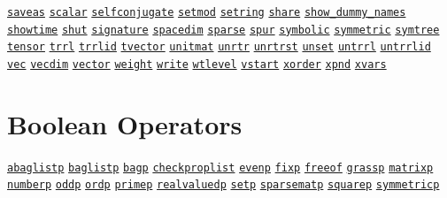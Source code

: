 \begin{list}{}
\hyperlink{command:SAVEAS}{\texttt{saveas}}
\hyperlink{command:SCALAR}{\texttt{scalar}}
\hyperlink{command:SELFCONJUGATE}{\texttt{selfconjugate}}
\hyperlink{command:SETMOD}{\texttt{setmod}}
\hyperlink{command:SETRING}{\texttt{setring}}
\hyperlink{command:SHARE}{\texttt{share}}
\hyperlink{command:SHOW_DUMMY_NAMES}{\texttt{show\_dummy\_names}}
\hyperlink{command:SHOWTIME}{\texttt{showtime}}
\hyperlink{command:SHUT}{\texttt{shut}}
\hyperlink{command:SIGNATURE}{\texttt{signature}}
\hyperlink{command:SPACEDIM}{\texttt{spacedim}}
\hyperlink{command:SPARSE}{\texttt{sparse}}
\hyperlink{command:SPUR}{\texttt{spur}}
\hyperlink{target:modes}{\texttt{symbolic}}
\hyperlink{reserved:SYMMETRIC}{\texttt{symmetric}}
\hyperlink{command:SYMTREE}{\texttt{symtree}}
\hyperlink{command:TENSOR}{\texttt{tensor}}
\hyperlink{command:TRRL}{\texttt{trrl}}
\hyperlink{command:TRRLID}{\texttt{trrlid}}
\hyperlink{command:TVECTOR}{\texttt{tvector}}
\hyperlink{command:UNITMAT}{\texttt{unitmat}}
\hyperlink{command:UNRTR}{\texttt{unrtr}}
\hyperlink{command:UNRTRST}{\texttt{unrtrst}}
\hyperlink{command:UNSET}{\texttt{unset}}
\hyperlink{command:UNTRRL}{\texttt{untrrl}}
\hyperlink{command:UNTRRLID}{\texttt{untrrlid}}
\hyperlink{command:VEC}{\texttt{vec}}
\hyperlink{command:VECDIM}{\texttt{vecdim}}
\hyperlink{command:VECTOR}{\texttt{vector}}
\hyperlink{command:WEIGHT}{\texttt{weight}}
\hyperlink{command:WRITE}{\texttt{write}}
\hyperlink{command:WTLEVEL}{\texttt{wtlevel}}
\hyperlink{command:VSTART}{\texttt{vstart}}
\hyperlink{command:XORDER}{\texttt{xorder}}
\hyperlink{command:XPND}{\texttt{xpnd}}
\hyperlink{command:XVARS}{\texttt{xvars}}
\halfinterwordspace

\section{Boolean Operators}

\doubleinterwordspace
\hyperlink{operator:ABAGLISTP}{\texttt{abaglistp}}
\hyperlink{operator:BAGLISTP}{\texttt{baglistp}}
\hyperlink{operator:BAGP}{\texttt{bagp}}
\hyperlink{operator:CHECKPROPLIST}{\texttt{checkproplist}}
\hyperlink{operator:EVENP}{\texttt{evenp}}
\hyperlink{operator:FIXP}{\texttt{fixp}}
\hyperlink{operator:FREEOF}{\texttt{freeof}}
\hyperlink{operator:GRASSP}{\texttt{grassp}}
\hyperlink{operator:MATRIXP}{\texttt{matrixp}}
\hyperlink{operator:NUMBERP}{\texttt{numberp}}
\hyperlink{operator:ODDP}{\texttt{oddp}}
\hyperlink{operator:ORDP}{\texttt{ordp}}
\hyperlink{operator:PRIMEP}{\texttt{primep}}
\hyperlink{operator:REALVALUEDP}{\texttt{realvaluedp}}
\hyperlink{operator:SETP}{\texttt{setp}}
\hyperlink{operator:SPARSEMATP}{\texttt{sparsematp}}
\hyperlink{operator:SQUAREP}{\texttt{squarep}}
\hyperlink{operator:SYMMETRICP}{\texttt{symmetricp}}
\halfinterwordspace


\end{list}
